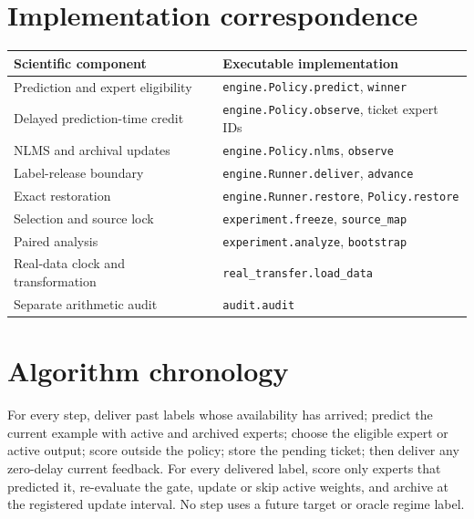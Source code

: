 \documentclass[10pt]{article}
\begin{document}
\appendix
\section{Implementation correspondence}
\begin{tabular}{p{.30\linewidth}p{.63\linewidth}}
\toprule
Scientific component & Executable implementation\\
\midrule
Prediction and expert eligibility & \texttt{engine.Policy.predict}, \texttt{winner}\\
Delayed prediction-time credit & \texttt{engine.Policy.observe}, ticket expert IDs\\
NLMS and archival updates & \texttt{engine.Policy.nlms}, \texttt{observe}\\
Label-release boundary & \texttt{engine.Runner.deliver}, \texttt{advance}\\
Exact restoration & \texttt{engine.Runner.restore}, \texttt{Policy.restore}\\
Selection and source lock & \texttt{experiment.freeze}, \texttt{source\_map}\\
Paired analysis & \texttt{experiment.analyze}, \texttt{bootstrap}\\
Real-data clock and transformation & \texttt{real\_transfer.load\_data}\\
Separate arithmetic audit & \texttt{audit.audit}\\
\bottomrule
\end{tabular}

\section{Algorithm chronology}
For every step, deliver past labels whose availability has arrived; predict the current example with active and archived experts; choose the eligible expert or active output; score outside the policy; store the pending ticket; then deliver any zero-delay current feedback. For every delivered label, score only experts that predicted it, re-evaluate the gate, update or skip active weights, and archive at the registered update interval. No step uses a future target or oracle regime label.
\end{document}
